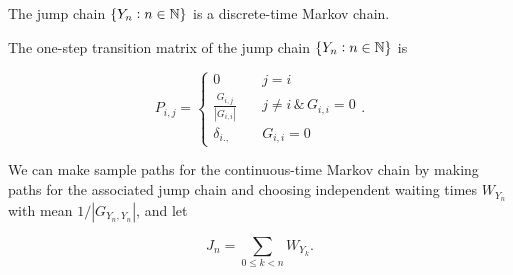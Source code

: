 \begin{remark}
    The jump chain $\{Y_n: n \in \mathbb{N}\}$ is a discrete-time Markov chain.
\end{remark}

\begin{proposition}
    The one-step transition matrix of the jump chain $\{Y_n: n \in \mathbb{N}\}$ is

    \begin{equation*}
        P_{i,j} = 
        \begin{cases}
            0 \quad & j = i \\ 
            \frac{G_{i,j}}{|G_{i,i}|} \quad & j \neq i \, \& \, G_{i,i} = 0 \\ 
            \delta_{i.,} \quad & G_{i,i} = 0
        \end{cases}.
    \end{equation*}
\end{proposition}

\begin{remark}
    We can make sample paths for the continuous-time Markov chain by making paths for the associated jump chain and choosing independent waiting times $W_{Y_n}$ with mean $1 / |G_{Y_n, Y_n}|$, and let

    \begin{equation*}
        J_n = \sum_{0 \le k < n} W_{Y_k}.
    \end{equation*}
\end{remark}
